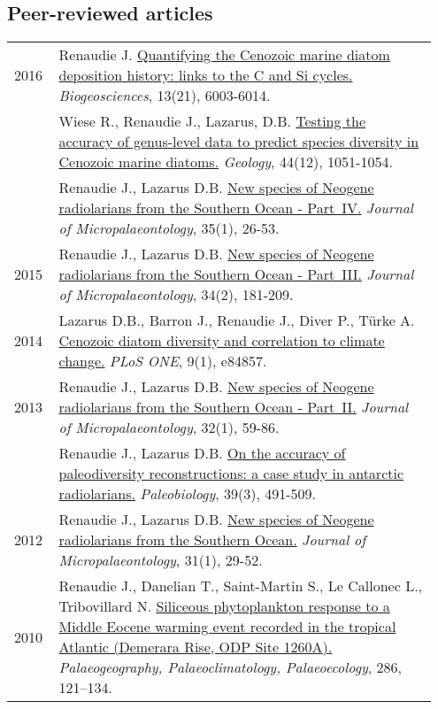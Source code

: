 \documentclass[11pt, a4paper]{article}
\begin{document}
\subsection{Peer-reviewed articles}
\begin{longtable}{p{0.1\linewidth} P{0.85\linewidth}}
2016 & Renaudie J. \href{http://dx.doi.org/10.5194/bg-13-6003-2016}{Quantifying the Cenozoic marine diatom deposition history: links to the C and Si cycles.} \emph{Biogeosciences}, 13(21), 6003-6014.\\
 & Wiese R., Renaudie J., Lazarus, D.B. \href{http://dx.doi.org/10.1130/G38347.1}{Testing the accuracy of genus-level data to predict species diversity in Cenozoic marine diatoms.} \emph{Geology}, 44(12), 1051-1054.\\
 & Renaudie J., Lazarus D.B. \href{http://dx.doi.org/10.1144/jmpaleo2014-026}{New species of Neogene radiolarians from the Southern Ocean - Part IV.} \emph{Journal of Micropalaeontology}, 35(1), 26-53.\\
2015 & Renaudie J., Lazarus D.B. \href{http://dx.doi.org/10.1144/jmpaleo2013-034}{New species of Neogene radiolarians from the Southern Ocean - Part III.} \emph{Journal of Micropalaeontology}, 34(2), 181-209.\\
2014 & Lazarus D.B., Barron J., Renaudie J., Diver P., Türke A. \href{http://dx.doi.org/10.1371/journal.pone.0084857}{Cenozoic diatom diversity and correlation to climate change.} \emph{PLoS ONE}, 9(1), e84857.\\
2013 & Renaudie J., Lazarus D.B. \href{http://dx.doi.org/10.1144/jmpaleo2011-025}{New species of Neogene radiolarians from the Southern Ocean - Part II.}\emph{ Journal of Micropalaeontology}, 32(1), 59-86.\\
 & Renaudie J., Lazarus D.B. \href{http://dx.doi.org/10.1666/12016}{On the accuracy of paleodiversity reconstructions: a case study in antarctic radiolarians.} \emph{Paleobiology}, 39(3), 491-509.\\
2012 & Renaudie J., Lazarus D.B. \href{http://dx.doi.org/10.1144/0262-821X10-026}{New species of Neogene radiolarians from the Southern Ocean.} \emph{Journal of Micropalaeontology}, 31(1), 29-52.\\
2010 & Renaudie J., Danelian T., Saint-Martin S., Le Callonec L., Tribovillard N. \href{http://dx.doi.org/10.1016/j.palaeo.2009.12.004}{Siliceous phytoplankton response to a Middle Eocene warming event recorded in the tropical Atlantic (Demerara Rise, ODP Site 1260A).} \emph{Palaeogeography, Palaeoclimatology, Palaeoecology}, 286, 121--134.\\
\end{longtable}
\end{document}
